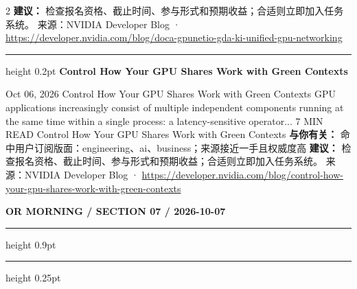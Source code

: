 \documentclass[10.5pt]{ctexart}
\begin{document}
\begin{multicols}{2}
\textbf{建议：} 检查报名资格、截止时间、参与形式和预期收益；合适则立即加入任务系统。
{\footnotesize\color{ormuted} 来源：NVIDIA Developer Blog · \url{https://developer.nvidia.com/blog/doca-gpunetio-gda-ki-unified-gpu-networking}}
\vspace{2mm}
\hrule height 0.2pt
\vspace{2mm}
{\large\bfseries Control How Your GPU Shares Work with Green Contexts}\par
Oct 06, 2026 Control How Your GPU Shares Work with Green Contexts GPU applications increasingly consist of multiple independent components running at the same time within a single process: a latency-sensitive operator... 7 MIN READ Control How Your GPU Shares Work with Green Contexts
\textbf{与你有关：} 命中用户订阅版面：engineering、ai、business；来源接近一手且权威度高
\textbf{建议：} 检查报名资格、截止时间、参与形式和预期收益；合适则立即加入任务系统。
{\footnotesize\color{ormuted} 来源：NVIDIA Developer Blog · \url{https://developer.nvidia.com/blog/control-how-your-gpu-shares-work-with-green-contexts}}
\end{multicols}
\newpage
{\small\bfseries OR MORNING / SECTION 07 / 2026-10-07}
\vspace{2mm}
\hrule height 0.9pt
\vspace{1.5mm}
\hrule height 0.25pt
\vspace{4mm}
\end{document}
